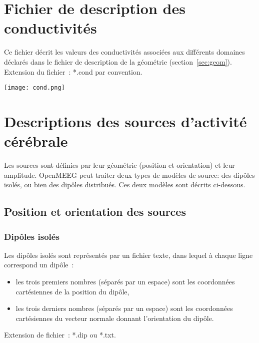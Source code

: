 \section{Fichier de description des conductivités}
\label{sec:cond}

\noindent
Ce fichier décrit les valeurs des conductivités associées aux différents domaines déclarés dans le fichier de description de la
géométrie (section~\ref{sec:geom}).\\
Extension du fichier~: *.cond par convention.\\

\centerline{\texttt{[image: cond.png]}}




\section{Descriptions des sources d'activité cérébrale}
Les sources sont définies par leur géométrie (position et orientation) et leur amplitude.
OpenMEEG peut traiter deux types de modèles de source: des dipôles isolés, ou bien des dipôles distribués.
Ces deux modèles sont décrits ci-dessous.

\subsection{Position et orientation des sources}
\label{sec:dipoles}
\subsubsection{Dipôles isolés}
\noindent
Les dipôles isolés sont représentés par un fichier texte, dans lequel à chaque ligne correspond un dipôle~:
\begin{itemize}
    \item les trois premiers nombres (séparés par un espace) sont les coordonnées cartésiennes de la position du dipôle,
    \item les trois derniers nombres (séparés par un espace) sont les coordonnées cartésiennes du vecteur normale donnant
           l'orientation du dipôle.
\end{itemize}
Extension de fichier~: *.dip ou *.txt.

